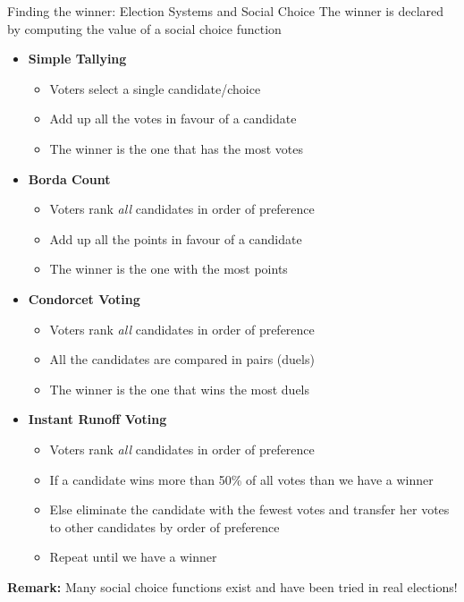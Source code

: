 \documentclass{beamer}
\begin{document}
\begin{frame}{Finding the winner: Election Systems and Social Choice}
The winner is declared by computing the value of a social choice function
\begin{itemize}
\item \textbf{Simple Tallying} 
\begin{itemize}
\item Voters select a single candidate/choice
\item Add up all the votes in favour of a candidate
\item The winner is the one that has the most votes
\end{itemize}
\item \textbf{Borda Count}
\begin{itemize}
\item Voters rank \textit{all} candidates in order of preference
\item Add up all the points in favour of a candidate
\item The winner is the one with the most points
\end{itemize}
\item \textbf{Condorcet Voting}
\begin{itemize}
\item Voters rank \textit{all} candidates in order of preference
\item All the candidates are compared in pairs (duels)
\item The winner is the one that wins the most duels
\end{itemize}
\item \textbf{Instant Runoff Voting}
\begin{itemize}
\item Voters rank \textit{all} candidates in order of preference
\item If a candidate wins more than 50\% of all votes than we have a winner
\item Else eliminate the candidate with the fewest votes and transfer her votes to other candidates by order of preference
\item Repeat until we have a winner
\end{itemize}

\end{itemize}

\textbf{Remark: } Many social choice functions exist and have been tried in real elections!
\end{frame}
\end{document}
